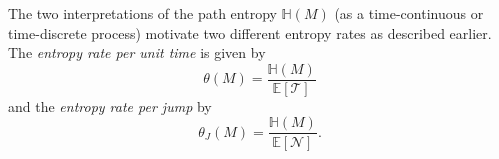 \documentclass[smallextended]{svjour3}
\newcommand{\E}{\mathbb{E}}
\newcommand{\TT}{\mathcal{T}}
\renewcommand{\H}{\mathbb{H}}
\newcommand{\red}[1]{\textcolor{red}{#1}}
\begin{document}
% 

The two interpretations of the path entropy $\H(M)$ (as a time-continuous or time-discrete process) motivate two different entropy rates as described earlier.
The \emph{entropy rate per unit time} is given by
\begin{equation*}
  \theta(M) = \frac{\H(M)}{\E\left[\TT\right]}
\end{equation*}
and the \emph{entropy rate per jump} by
\begin{equation*}
  \theta_J(M) = \frac{\H(M)}{\E\left[\mathcal{N}\right]}.
\end{equation*}
\end{document}
